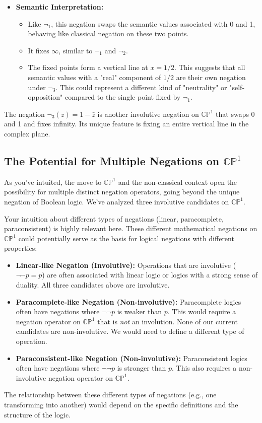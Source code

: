 \documentclass{article}
\begin{document}
\begin{itemize}
		\item \textbf{Semantic Interpretation:}
		\begin{itemize}
			\item Like $\neg_1$, this negation swaps the semantic values associated with 0 and 1, behaving like classical negation on these two points.
			\item It fixes $\infty$, similar to $\neg_1$ and $\neg_2$.
			\item The fixed points form a vertical line at $x = 1/2$. This suggests that all semantic values with a "real" component of $1/2$ are their own negation under $\neg_3$. This could represent a different kind of "neutrality" or "self-opposition" compared to the single point fixed by $\neg_1$.
		\end{itemize}
	\end{itemize}
	The negation $\neg_3(z) = 1 - \bar{z}$ is another involutive negation on $\mathbb{CP}^1$ that swaps 0 and 1 and fixes infinity. Its unique feature is fixing an entire vertical line in the complex plane.
	
	\subsection{The Potential for Multiple Negations on $\mathbb{CP}^1$}
	
	As you've intuited, the move to $\mathbb{CP}^1$ and the non-classical context open the possibility for multiple distinct negation operators, going beyond the unique negation of Boolean logic. We've analyzed three involutive candidates on $\mathbb{CP}^1$.
	
	Your intuition about different types of negations (linear, paracomplete, paraconsistent) is highly relevant here. These different mathematical negations on $\mathbb{CP}^1$ could potentially serve as the basis for logical negations with different properties:
	
	\begin{itemize}
		\item \textbf{Linear-like Negation (Involutive):} Operations that are involutive ($\neg\neg p = p$) are often associated with linear logic or logics with a strong sense of duality. All three candidates above are involutive.
		
		\item \textbf{Paracomplete-like Negation (Non-involutive):} Paracomplete logics often have negations where $\neg\neg p$ is weaker than $p$. This would require a negation operator on $\mathbb{CP}^1$ that is \textit{not} an involution. None of our current candidates are non-involutive. We would need to define a different type of operation.
		
		\item \textbf{Paraconsistent-like Negation (Non-involutive):} Paraconsistent logics often have negations where $\neg\neg p$ is stronger than $p$. This also requires a non-involutive negation operator on $\mathbb{CP}^1$.
	\end{itemize}
	The relationship between these different types of negations (e.g., one transforming into another) would depend on the specific definitions and the structure of the logic.
	
\end{document}
